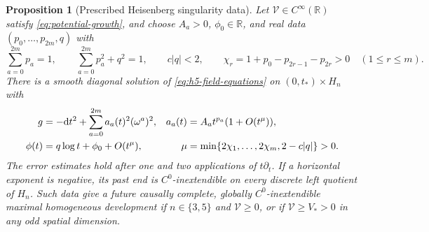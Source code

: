 \documentclass[10pt,a4paper]{article}
\numberwithin{equation}{section}
\newtheorem{proposition}[theorem]{Proposition}
\theoremstyle{definition}
\theoremstyle{remark}
\newcommand{\R}{\mathbb R}
\newcommand{\dd}{\mathrm d}
\begin{document}
\begin{proposition}[Prescribed Heisenberg singularity data]
\label{prop:h5-einstein}
Let $\mathcal V\in C^\infty(\R)$ satisfy \eqref{eq:potential-growth}, and choose
$A_a>0$, $\phi_0\in\R$, and real data $(p_0,\ldots,p_{2m},q)$ with
\begin{equation}
 \sum_{a=0}^{2m}p_a=1,\qquad
 \sum_{a=0}^{2m}p_a^2+q^2=1,\qquad c|q|<2,\qquad
 \chi_r=1+p_0-p_{2r-1}-p_{2r}>0\quad(1\le r\le m).
 \label{eq:h5-kasner-data}
\end{equation}
There is a smooth diagonal solution of \eqref{eq:h5-field-equations}
on $(0,t_*)\times H_n$ with
\begin{align}
 g&=-\dd t^2+\sum_{a=0}^{2m}a_a(t)^2(\omega^a)^2,
 &a_a(t)&=A_at^{p_a}(1+O(t^\mu)),\notag\\
 \phi(t)&=q\log t+\phi_0+O(t^\mu),
 &\mu&=\min\{2\chi_1,\ldots,2\chi_m,2-c|q|\}>0.
 \label{eq:h5-asymptotics}
\end{align}
The error estimates hold after one and two applications of
$t\partial_t$.  If a horizontal exponent is negative, its past end is
$C^0$-inextendible on every discrete left quotient of $H_n$.
Such data give a future causally complete, globally $C^0$-inextendible
maximal homogeneous development if $n\in\{3,5\}$ and $\mathcal V\ge0$,
or if $\mathcal V\ge V_*>0$ in any odd spatial dimension.
\end{proposition}
\end{document}
